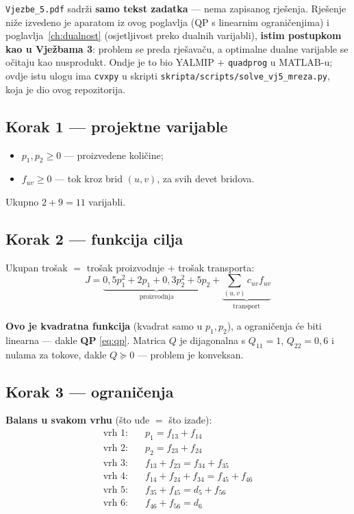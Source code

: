 \begin{zadatak}
\begin{napomena}
\texttt{Vjezbe\_5.pdf} sadrži \textbf{samo tekst zadatka} --- nema zapisanog
rješenja. Rješenje niže izvedeno je aparatom iz ovog poglavlja (QP s linearnim
ograničenjima) i poglavlja~\ref{ch:dualnost} (osjetljivost preko dualnih
varijabli), \textbf{istim postupkom kao u Vježbama 3}: problem se preda
rješavaču, a optimalne dualne varijable se očitaju kao nusprodukt. Ondje je to
bio YALMIP $+$ \texttt{quadprog} u MATLAB-u; ovdje istu ulogu ima
\texttt{cvxpy} u skripti
\texttt{skripta/scripts/solve\_vj5\_mreza.py}, koja je dio ovog repozitorija.
\end{napomena}

\subsection*{Korak 1 --- projektne varijable}

\begin{itemize}
  \item $p_1, p_2 \ge 0$ --- proizvedene količine;
  \item $f_{uv} \ge 0$ --- tok kroz brid $(u,v)$, za svih devet bridova.
\end{itemize}

Ukupno $2 + 9 = 11$ varijabli.

\subsection*{Korak 2 --- funkcija cilja}

Ukupan trošak $=$ trošak proizvodnje $+$ trošak transporta:
\[
J = \underbrace{0{,}5p_1^2 + 2p_1 + 0{,}3p_2^2 + 5p_2}_{\text{proizvodnja}}
  + \underbrace{\sum_{(u,v)} c_{uv}f_{uv}}_{\text{transport}}
\]

\textbf{Ovo je kvadratna funkcija} (kvadrat samo u $p_1, p_2$), a ograničenja
će biti linearna --- dakle \textbf{QP} \eqref{eq:qp}. Matrica $Q$ je
dijagonalna s $Q_{11} = 1$, $Q_{22} = 0{,}6$ i nulama za tokove, dakle
$Q \succeq 0$ --- problem je konveksan.

\subsection*{Korak 3 --- ograničenja}

\textbf{Balans u svakom vrhu} (što uđe $=$ što izađe):
\[
\begin{aligned}
\text{vrh 1:}\quad & p_1 = f_{13} + f_{14} \\
\text{vrh 2:}\quad & p_2 = f_{23} + f_{24} \\
\text{vrh 3:}\quad & f_{13} + f_{23} = f_{34} + f_{35} \\
\text{vrh 4:}\quad & f_{14} + f_{24} + f_{34} = f_{45} + f_{46} \\
\text{vrh 5:}\quad & f_{35} + f_{45} = d_5 + f_{56} \\
\text{vrh 6:}\quad & f_{46} + f_{56} = d_6
\end{aligned}
\]


\end{zadatak}
